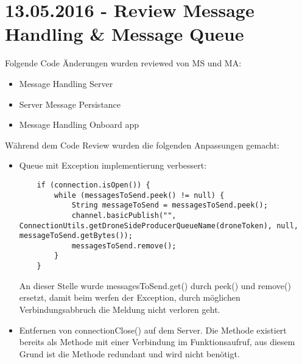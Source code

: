 \section{13.05.2016 - Review Message Handling \& Message Queue}
Folgende Code Änderungen wurden reviewed von MS und MA:
\begin{itemize}
	\item{Message Handling Server}
	\item{Server Message Persistance}
	\item{Message Handling Onboard app}
\end{itemize}
Während dem Code Review wurden die folgenden Anpassungen gemacht:
\begin{itemize}
	\item{Queue mit Exception implementierung verbessert:
	\begin{lstlisting}
    if (connection.isOpen()) {
        while (messagesToSend.peek() != null) {
            String messageToSend = messagesToSend.peek();
            channel.basicPublish("", ConnectionUtils.getDroneSideProducerQueueName(droneToken), null, messageToSend.getBytes());
            messagesToSend.remove();
        }
    }
	\end{lstlisting}
	An dieser Stelle wurde messagesToSend.get() durch peek() und remove() ersetzt, damit beim werfen der Exception, durch möglichen Verbindungsabbruch die Meldung nicht verloren geht.}
	\item{Entfernen von connectionClose() auf dem Server. Die Methode existiert bereits als Methode mit einer Verbindung im Funktionsaufruf, aus diesem Grund ist die Methode redundant und wird nicht benötigt.}
\end{itemize}
